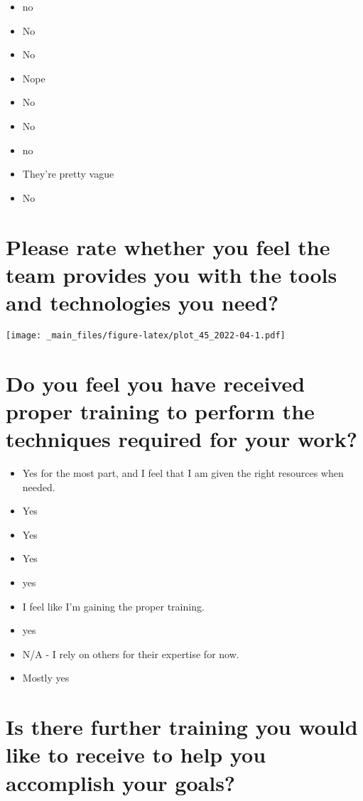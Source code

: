 \documentclass[
]{book}
\providecommand{\tightlist}{%
  \setlength{\itemsep}{0pt}\setlength{\parskip}{0pt}}
\begin{document}
\begin{itemize}
\tightlist
\item
  no
\item
  No
\item
  No
\item
  Nope
\item
  No
\item
  No
\item
  no
\item
  They're pretty vague
\item
  No
\end{itemize}

\hypertarget{please-rate-whether-you-feel-the-team-provides-you-with-the-tools-and-technologies-you-need}{%
\section{Please rate whether you feel the team provides you with the tools and technologies you need?}\label{please-rate-whether-you-feel-the-team-provides-you-with-the-tools-and-technologies-you-need}}

\texttt{[image: \_main\_files/figure-latex/plot\_45\_2022-04-1.pdf]}

\hypertarget{do-you-feel-you-have-received-proper-training-to-perform-the-techniques-required-for-your-work}{%
\section{Do you feel you have received proper training to perform the techniques required for your work?}\label{do-you-feel-you-have-received-proper-training-to-perform-the-techniques-required-for-your-work}}

\begin{itemize}
\tightlist
\item
  Yes for the most part, and I feel that I am given the right resources when needed.
\item
  Yes
\item
  Yes
\item
  Yes
\item
  yes
\item
  I feel like I'm gaining the proper training.
\item
  yes
\item
  N/A - I rely on others for their expertise for now.
\item
  Mostly yes
\end{itemize}

\hypertarget{is-there-further-training-you-would-like-to-receive-to-help-you-accomplish-your-goals}{%
\section{Is there further training you would like to receive to help you accomplish your goals?}\label{is-there-further-training-you-would-like-to-receive-to-help-you-accomplish-your-goals}}
\end{document}
